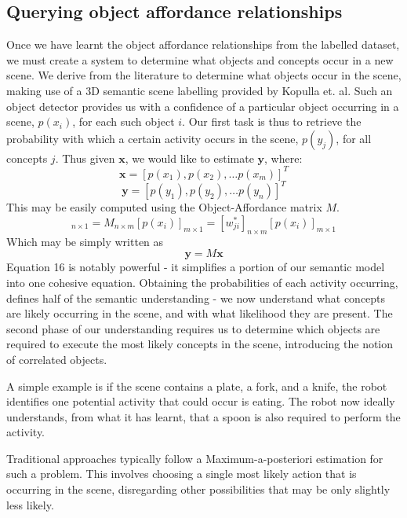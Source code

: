\subsection{Querying object affordance relationships}
Once we have learnt the object affordance relationships from the labelled dataset, we must create a system to determine what objects and concepts occur in a new scene. We derive from the literature to determine what objects occur in the scene, making use of a 3D semantic scene labelling provided by Kopulla et. al. Such an object detector provides us with a confidence of a particular object occurring in a scene, $p(x_i)$, for each such object $i$. Our first task is thus to retrieve the probability with which a certain activity occurs in the scene, $p(y_j)$, for all concepts $j$. Thus given $\mathbf{x}$, we would like to estimate $\mathbf{y}$, where:
$$ \mathbf{x} = [p(x_1),p(x_2),\dots p(x_m)]^T$$
$$ \mathbf{y} = [p(y_1),p(y_2),\dots p(y_n)]^T$$
This may be easily computed using the Object-Affordance matrix $M$. 
\begin{equation}
[p(y_j)]_{n \times 1} = M_{n \times m} [p(x_i)]_{m \times 1} = [w_{ji}^*]_{n \times m} [p(x_i)]_{m \times 1}
\end{equation}
Which may be simply written as
\begin{equation}
\mathbf{y}=M \mathbf{x}
\end{equation}
Equation 16 is notably powerful - it simplifies a portion of our semantic model into one cohesive equation. Obtaining the probabilities of each activity occurring, defines half of the semantic understanding - we now understand what concepts are likely occurring in the scene, and with what likelihood they are present. The second phase of our understanding requires us to determine which objects are required to execute the most likely concepts in the scene, introducing the notion of correlated objects. 

A simple example is if the scene contains a plate, a fork, and a knife, the robot identifies one potential activity that could occur is eating.  The robot now ideally understands, from what it has learnt, that a spoon is also required to perform the activity. 

Traditional approaches typically follow a Maximum-a-posteriori estimation for such a problem. This involves choosing a single most likely action that is occurring in the scene, disregarding other possibilities that may be only slightly less likely. 

